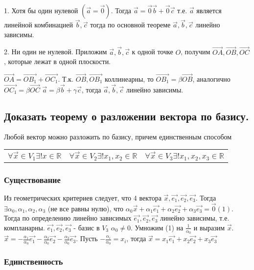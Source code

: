 \documentclass[a4paper, 10pt]{article}
\newcommand{\bvec}[1]{\overrightarrow{#1}}
\renewcommand{\a}{\vec{a}}
\renewcommand{\b}{\vec{b}}
\renewcommand{\c}{\vec{c}}
\newcommand{\nul}{\vec{0}}
\newcommand{\image}[2]{
	\begin{figure}[H]
		\center{\texttt{[image: img/\#1]} }
    \end{figure}
}
\begin{document}
1. Хотя бы один нулевой $(\a = \nul)$. Тогда $\a = \nul\b + \nul\c$
т.е. $\a$ является линейной комбинацией $\b, \c$ тогда по основной теореме
$\a, \b, \c$ линейно зависимы. 

2. Ни один не нулевой. Приложим $\a, \b, \c$ к одной точке $O$, 
получим $\bvec{OA}, \bvec{OB}, \bvec{OC}$, которые лежат в одной плоскости.
\image{3.png}{200}
$\bvec{OA} = \bvec{OB_1} + \bvec{OC_1}$. Т.к. $\bvec{OB}, \bvec{OB_1}$ коллинеарны, то
$\bvec{OB_1} = \beta\bvec{OB}$, аналогично $\bvec{OC_1} = \beta\bvec{OC}$ 
$\a = \beta\b + \gamma\c$, тогда $\a, \b, \c$ линейно зависимы.

\subsection{Доказать теорему о разложении вектора по базису.}

\begin{center}
Любой вектор можно разложить по базису, причем единственным способом
\begin{tabular}{c c c} 
    $\forall \vec{x} \in V_1 \exists ! x \in \mathbb{R}$&
    $\forall \vec{x} \in V_2 \exists ! x_1, x_2 \in \mathbb{R}$&
    $\forall \vec{x} \in V_3 \exists ! x_1, x_2, x_3 \in \mathbb{R}$\\
\end{tabular}
\end{center}

\subsubsection{Существование}

Из геометрических критериев следует, что 4 вектора $\vec{x}, \vec{e_1}, \vec{e_2}, \vec{e_3}$.
Тогда $\exists \alpha_0, \alpha_1, \alpha_2, \alpha_3$ (не все равны нулю), что
$\alpha_0\vec{x} + \alpha_1\vec{e_1} + \alpha_2\vec{e_2} + \alpha_3\vec{e_3} = \nul (1)$.
Тогда по определению линейно зависимых $\vec{e_1}, \vec{e_2}, \vec{e_3}$ линейно зависимы,
т.е. компланарны. $\vec{e_1}, \vec{e_2}, \vec{e_3}$ - базис в $V_3$ $\alpha_0 \ne 0$.
Умножим (1) на $\frac{1}{\alpha_0}$ и выразим $\vec{x}$. 
$\vec{x} = -\frac{\alpha_1}{\alpha_0}\vec{e_1}-\frac{\alpha_2}{\alpha_0}\vec{e_2}
-\frac{\alpha_3}{\alpha_0}\vec{e_3}$. Пусть $-\frac{\alpha_i}{\alpha_0} = x_i$, тогда
$\vec{x} = x_1\vec{e_1} + x_2\vec{e_2} + x_3\vec{e_3}$

\subsubsection{Единственность}
\end{document}
